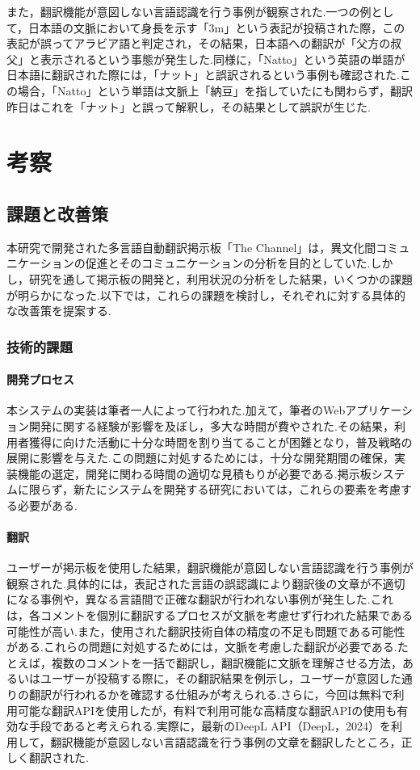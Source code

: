\documentclass[b5paper,12pt,dvipdfmx]{jsreport}
\begin{document}
また，翻訳機能が意図しない言語認識を行う事例が観察された.一つの例として，日本語の文脈において身長を示す「3m」という表記が投稿された際，この表記が誤ってアラビア語と判定され，その結果，日本語への翻訳が「父方の叔父」と表示されるという事態が発生した.同様に，「Natto」という英語の単語が日本語に翻訳された際には，「ナット」と誤訳されるという事例も確認された.この場合，「Natto」という単語は文脈上「納豆」を指していたにも関わらず，翻訳昨日はこれを「ナット」と誤って解釈し，その結果として誤訳が生じた.


\chapter{考察}

\section{課題と改善策}
本研究で開発された多言語自動翻訳掲示板「The Channel」は，異文化間コミュニケーションの促進とそのコミュニケーションの分析を目的としていた.しかし，研究を通して掲示板の開発と，利用状況の分析をした結果，いくつかの課題が明らかになった.以下では，これらの課題を検討し，それぞれに対する具体的な改善策を提案する.

\subsection{技術的課題}

\subsubsection{開発プロセス}
本システムの実装は筆者一人によって行われた.加えて，筆者のWebアプリケーション開発に関する経験が影響を及ぼし，多大な時間が費やされた.その結果，利用者獲得に向けた活動に十分な時間を割り当てることが困難となり，普及戦略の展開に影響を与えた.この問題に対処するためには，十分な開発期間の確保，実装機能の選定，開発に関わる時間の適切な見積もりが必要である.掲示板システムに限らず，新たにシステムを開発する研究においては，これらの要素を考慮する必要がある.

\subsubsection{翻訳}
ユーザーが掲示板を使用した結果，翻訳機能が意図しない言語認識を行う事例が観察された.具体的には，表記された言語の誤認識により翻訳後の文章が不適切になる事例や，異なる言語間で正確な翻訳が行われない事例が発生した.これは，各コメントを個別に翻訳するプロセスが文脈を考慮せず行われた結果である可能性が高い.また，使用された翻訳技術自体の精度の不足も問題である可能性がある.これらの問題に対処するためには，文脈を考慮した翻訳が必要である.たとえば，複数のコメントを一括で翻訳し，翻訳機能に文脈を理解させる方法，あるいはユーザーが投稿する際に，その翻訳結果を例示し，ユーザーが意図した通りの翻訳が行われるかを確認する仕組みが考えられる.さらに，今回は無料で利用可能な翻訳APIを使用したが，有料で利用可能な高精度な翻訳APIの使用も有効な手段であると考えられる.実際に，最新のDeepL API（DeepL，2024）を利用して，翻訳機能が意図しない言語認識を行う事例の文章を翻訳したところ，正しく翻訳された.
\end{document}

